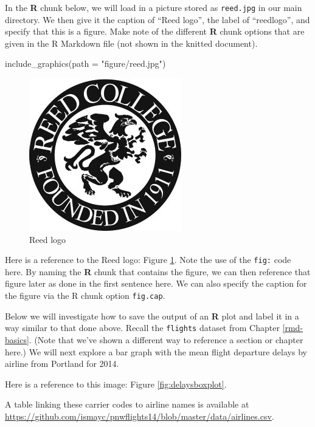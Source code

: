 \documentclass[12pt,twoside]{reedthesis}
\newenvironment{Shaded}{\begin{snugshade}}{\end{snugshade}}
\newcommand{\AttributeTok}[1]{\textcolor[rgb]{0.77,0.63,0.00}{#1}}
\newcommand{\FunctionTok}[1]{\textcolor[rgb]{0.00,0.00,0.00}{#1}}
\newcommand{\NormalTok}[1]{#1}
\newcommand{\StringTok}[1]{\textcolor[rgb]{0.31,0.60,0.02}{#1}}
\begin{document}
In the \textbf{R} chunk below, we will load in a picture stored as \texttt{reed.jpg} in our main directory. We then give it the caption of ``Reed logo'', the label of ``reedlogo'', and specify that this is a figure. Make note of the different \textbf{R} chunk options that are given in the R Markdown file (not shown in the knitted document).
\begin{Shaded}
\begin{Highlighting}[]
\FunctionTok{include\_graphics}\NormalTok{(}\AttributeTok{path =} \StringTok{"figure/reed.jpg"}\NormalTok{)}
\end{Highlighting}
\end{Shaded}
\begin{figure}

{\centering \includegraphics[width=0.2\linewidth]{figure/reed} 

}

\caption{Reed logo}\label{fig:reedlogo}
\end{figure}
Here is a reference to the Reed logo: Figure \ref{fig:reedlogo}. Note the use of the \texttt{fig:} code here. By naming the \textbf{R} chunk that contains the figure, we can then reference that figure later as done in the first sentence here. We can also specify the caption for the figure via the R chunk option \texttt{fig.cap}.

\clearpage

Below we will investigate how to save the output of an \textbf{R} plot and label it in a way similar to that done above. Recall the \texttt{flights} dataset from Chapter \ref{rmd-basics}. (Note that we've shown a different way to reference a section or chapter here.) We will next explore a bar graph with the mean flight departure delays by airline from Portland for 2014.

Here is a reference to this image: Figure \ref{fig:delaysboxplot}.

A table linking these carrier codes to airline names is available at \url{https://github.com/ismayc/pnwflights14/blob/master/data/airlines.csv}.

\clearpage
\end{document}

